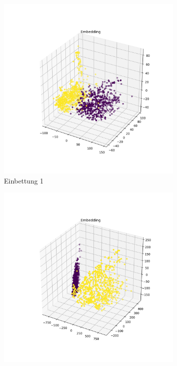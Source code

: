 	\begin{figure}[h]
		\centering
		\begin{subfigure}[c]{0.32\textwidth}			
			\includegraphics[width=1\textwidth,center]{bilder/Hauptteil/Step4_Data/Embedding_auto_1.png}
			\caption{Einbettung 1}
			\label{img:AutoMLEinbettungV1}	
		\end{subfigure}
		\begin{subfigure}[c]{0.32\textwidth}			
			\includegraphics[width=1\textwidth, center]{bilder/Hauptteil/Step4_Data/Embedding_Auto_2.png}

\end{subfigure}
\end{figure}
